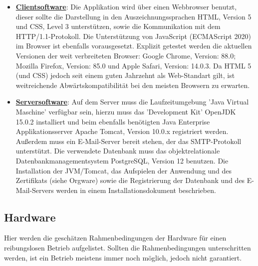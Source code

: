 \documentclass{article}
\begin{document}
\begin{itemize}
\item \underline{\textbf{Clientsoftware}}: \linebreak
Die Applikation wird über einen Webbrowser benutzt, dieser sollte die Darstellung in den Auszeichnungssprachen HTML, Version 5 und CSS, Level 3 unterstützen, sowie die Kommunikation mit dem HTTP/1.1-Protokoll. Die Unterstützung von JavaScript (ECMAScript 2020) im Browser ist ebenfalls vorausgesetzt. Explizit getestet werden die aktuellen Versionen der weit verbreiteten Browser: Google Chrome, Version: 88.0; Mozilla Firefox, Version: 85.0 und Apple Safari, Version: 14.0.3. Da HTML 5 (und CSS) jedoch seit einem guten Jahrzehnt als Web-Standart gilt, ist weitreichende Abwärtskompatibilität bei den meisten Browsern zu erwarten.  


\item \underline{\textbf{Serversoftware}}: \linebreak
Auf dem Server muss die Laufzeitumgebung 'Java Virtual Maschine' verfügbar sein, hierzu muss das 'Development Kit' OpenJDK 15.0.2 installiert und beim ebenfalls benötigten Java Enterprise Applikationsserver Apache Tomcat, Version 10.0.x registriert werden. Außerdem muss ein E-Mail-Server bereit stehen, der das SMTP-Protokoll unterstützt. Die verwendete Datenbank muss das objektrelationale Datenbankmanagementsystem PostgreSQL, Version 12 benutzen. Die Installation der JVM/Tomcat, das Aufspielen der Anwendung und des Zertifikats (siehe Orgware) sowie die Registrierung der Datenbank und des E-Mail-Servers werden in einem Installationsdokument beschrieben.
\end{itemize}

\subsection{Hardware}

Hier werden die geschätzen Rahmenbedingungen der Hardware für einen reibungslosen Betrieb aufgelistet. Sollten die Rahmenbedingungen unterschritten werden, ist ein Betrieb meistens immer noch möglich, jedoch nicht garantiert.
\end{document}
